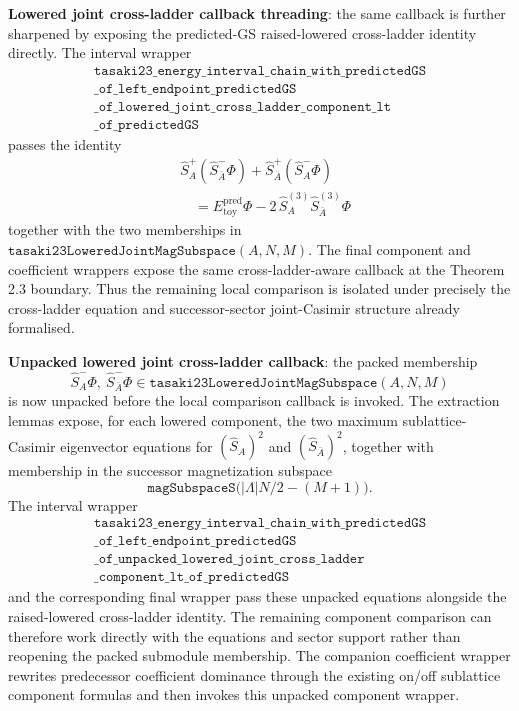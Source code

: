 \documentclass[a4paper,11pt]{article}
\begin{document}
\textbf{Lowered joint cross-ladder callback threading}: the same
callback is further sharpened by exposing the predicted-GS
raised-lowered cross-ladder identity directly.  The interval wrapper
\[
\begin{gathered}
\texttt{tasaki23\_energy\_interval\_chain\_with\_predictedGS}\\
\texttt{\_of\_left\_endpoint\_predictedGS}\\
\texttt{\_of\_lowered\_joint\_cross\_ladder\_component\_lt}\\
\texttt{\_of\_predictedGS}
\end{gathered}
\]
passes the identity
\[
\begin{aligned}
  &\hat S_A^+(\hat S_{\bar A}^-\Phi)
    + \hat S_{\bar A}^+(\hat S_A^-\Phi) \\
  &\quad =
    E_{\mathrm{toy}}^{\mathrm{pred}}\Phi
    - 2\,\hat S_A^{(3)}\hat S_{\bar A}^{(3)}\Phi
\end{aligned}
\]
together with the two memberships in
\(\texttt{tasaki23LoweredJointMagSubspace}(A,N,M)\).  The final
component and coefficient wrappers expose the same cross-ladder-aware
callback at the Theorem 2.3 boundary.  Thus the remaining local
comparison is isolated under precisely the cross-ladder equation and
successor-sector joint-Casimir structure already formalised.

\textbf{Unpacked lowered joint cross-ladder callback}: the packed
membership
\[
  \hat S_A^-\Phi,\ \hat S_{\bar A}^-\Phi
  \in \texttt{tasaki23LoweredJointMagSubspace}(A,N,M)
\]
is now unpacked before the local comparison callback is invoked.  The
extraction lemmas expose, for each lowered component, the two maximum
sub\-lattice-Casimir eigenvector equations for \((\hat S_A)^2\) and
\((\hat S_{\bar A})^2\), together with membership in the successor
magnetization subspace
\[
  \texttt{magSubspaceS}\bigl(|\Lambda|N/2-(M+1)\bigr).
\]
The interval wrapper
\[
\begin{gathered}
\texttt{tasaki23\_energy\_interval\_chain\_with\_predictedGS}\\
\texttt{\_of\_left\_endpoint\_predictedGS}\\
\texttt{\_of\_unpacked\_lowered\_joint\_cross\_ladder}\\
\texttt{\_component\_lt\_of\_predictedGS}
\end{gathered}
\]
and the corresponding final wrapper pass these unpacked equations
alongside the raised-lowered cross-ladder identity.  The remaining
component comparison can therefore work directly with the equations and
sector support rather than reopening the packed submodule membership.
The companion coefficient wrapper rewrites predecessor coefficient
dominance through the existing on/off sublattice component formulas and
then invokes this unpacked component wrapper.
\end{document}
